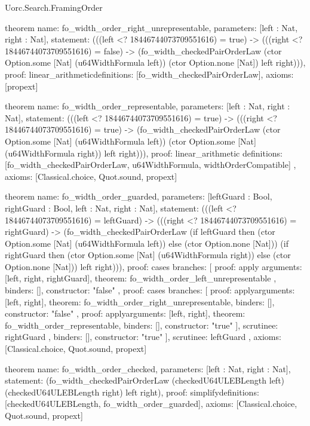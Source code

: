 \begin{lexlean}{Uorc.Search.FramingOrder}
\begin{semanticmodule}
theorem{
  name: fo_width_order_right_unrepresentable,
  parameters: [left : Nat, right : Nat],
  statement: (((left <? 18446744073709551616) = true) -> (((right <? 18446744073709551616) = false) -> (fo_width_checkedPairOrderLaw (ctor Option.some [Nat] (u64WidthFormula left)) (ctor Option.none [Nat]) left right))),
  proof: linear_arithmetic{definitions: [fo_width_checkedPairOrderLaw]},
  axioms: [propext]
}

theorem{
  name: fo_width_order_representable,
  parameters: [left : Nat, right : Nat],
  statement: (((left <? 18446744073709551616) = true) -> (((right <? 18446744073709551616) = true) -> (fo_width_checkedPairOrderLaw (ctor Option.some [Nat] (u64WidthFormula left)) (ctor Option.some [Nat] (u64WidthFormula right)) left right))),
  proof: linear_arithmetic{
    definitions: [fo_width_checkedPairOrderLaw, u64WidthFormula, widthOrderCompatible]
  },
  axioms: [Classical.choice, Quot.sound, propext]
}

theorem{
  name: fo_width_order_guarded,
  parameters: [leftGuard : Bool, rightGuard : Bool, left : Nat, right : Nat],
  statement: (((left <? 18446744073709551616) = leftGuard) -> (((right <? 18446744073709551616) = rightGuard) -> (fo_width_checkedPairOrderLaw (if leftGuard then (ctor Option.some [Nat] (u64WidthFormula left)) else (ctor Option.none [Nat])) (if rightGuard then (ctor Option.some [Nat] (u64WidthFormula right)) else (ctor Option.none [Nat])) left right))),
  proof: cases{
    branches: [
      {
        proof: apply{
          arguments: [left, right, rightGuard],
          theorem: fo_width_order_left_unrepresentable
        },
        binders: [],
        constructor: "false"
      },
      {
        proof: cases{
          branches: [
            {
              proof: apply{arguments: [left, right], theorem: fo_width_order_right_unrepresentable},
              binders: [],
              constructor: "false"
            },
            {
              proof: apply{arguments: [left, right], theorem: fo_width_order_representable},
              binders: [],
              constructor: "true"
            }
          ],
          scrutinee: rightGuard
        },
        binders: [],
        constructor: "true"
      }
    ],
    scrutinee: leftGuard
  },
  axioms: [Classical.choice, Quot.sound, propext]
}

theorem{
  name: fo_width_order_checked,
  parameters: [left : Nat, right : Nat],
  statement: (fo_width_checkedPairOrderLaw (checkedU64ULEBLength left) (checkedU64ULEBLength right) left right),
  proof: simplify{definitions: [checkedU64ULEBLength, fo_width_order_guarded]},
  axioms: [Classical.choice, Quot.sound, propext]
}


\end{semanticmodule}
\end{lexlean}
